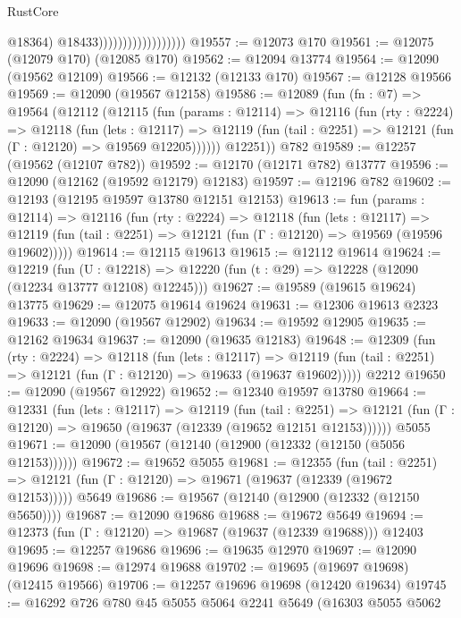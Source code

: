 \begin{lexlean}{RustCore}
\begin{coremodule}
                                          @18364)
                                        @18433))))))))))))))))))
@19557 := @12073 @170
@19561 := @12075 (@12079 @170) (@12085 @170)
@19562 := @12094 @13774
@19564 := @12090 (@19562 @12109)
@19566 := @12132 (@12133 @170)
@19567 := @12128 @19566
@19569 := @12090 (@19567 @12158)
@19586 := @12089
    (fun (fn : @7) =>
    @19564
      (@12112
        (@12115
          (fun (params : @12114) =>
          @12116
            (fun (rty : @2224) =>
            @12118
              (fun (lets : @12117) =>
              @12119 (fun (tail : @2251) => @12121 (fun (Γ : @12120) => @19569 @12205))))))
        @12251))
    @782
@19589 := @12257 (@19562 (@12107 @782))
@19592 := @12170 (@12171 @782) @13777
@19596 := @12090 (@12162 (@19592 @12179) @12183)
@19597 := @12196 @782
@19602 := @12193 (@12195 @19597 @13780 @12151 @12153)
@19613 := fun (params : @12114) =>
  @12116
    (fun (rty : @2224) =>
    @12118
      (fun (lets : @12117) =>
      @12119 (fun (tail : @2251) => @12121 (fun (Γ : @12120) => @19569 (@19596 @19602)))))
@19614 := @12115 @19613
@19615 := @12112 @19614
@19624 := @12219
    (fun (U : @12218) => @12220 (fun (t : @29) => @12228 (@12090 (@12234 @13777 @12108) @12245)))
@19627 := @19589 (@19615 @19624) @13775
@19629 := @12075 @19614 @19624
@19631 := @12306 @19613 @2323
@19633 := @12090 (@19567 @12902)
@19634 := @19592 @12905
@19635 := @12162 @19634
@19637 := @12090 (@19635 @12183)
@19648 := @12309
    (fun (rty : @2224) =>
    @12118
      (fun (lets : @12117) =>
      @12119 (fun (tail : @2251) => @12121 (fun (Γ : @12120) => @19633 (@19637 @19602)))))
    @2212
@19650 := @12090 (@19567 @12922)
@19652 := @12340 @19597 @13780
@19664 := @12331
    (fun (lets : @12117) =>
    @12119
      (fun (tail : @2251) =>
      @12121 (fun (Γ : @12120) => @19650 (@19637 (@12339 (@19652 @12151 @12153))))))
    @5055
@19671 := @12090 (@19567 (@12140 (@12900 (@12332 (@12150 (@5056 @12153))))))
@19672 := @19652 @5055
@19681 := @12355
    (fun (tail : @2251) => @12121 (fun (Γ : @12120) => @19671 (@19637 (@12339 (@19672 @12153)))))
    @5649
@19686 := @19567 (@12140 (@12900 (@12332 (@12150 @5650))))
@19687 := @12090 @19686
@19688 := @19672 @5649
@19694 := @12373 (fun (Γ : @12120) => @19687 (@19637 (@12339 @19688))) @12403
@19695 := @12257 @19686
@19696 := @19635 @12970
@19697 := @12090 @19696
@19698 := @12974 @19688
@19702 := @19695 (@19697 @19698) (@12415 @19566)
@19706 := @12257 @19696 @19698 (@12420 @19634)
@19745 := @16292
    @726
    @780
    @45
    @5055
    @5064
    @2241
    @5649
    (@16303
      @5055
      @5062

\end{coremodule}
\end{lexlean}
